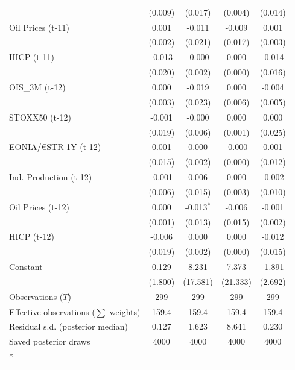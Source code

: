 \begin{longtable}[t]{lcccc}
 & (0.009) & (0.017) & (0.004) & (0.014)\\
Oil Prices (t-11) & 0.001 & -0.011 & -0.009 & 0.001\\
 & (0.002) & (0.021) & (0.017) & (0.003)\\
HICP (t-11) & -0.013 & -0.000 & 0.000 & -0.014\\
 & (0.020) & (0.002) & (0.000) & (0.016)\\
OIS\_3M (t-12) & 0.000 & -0.019 & 0.000 & -0.004\\
 & (0.003) & (0.023) & (0.006) & (0.005)\\
STOXX50 (t-12) & -0.001 & -0.000 & 0.000 & 0.000\\
 & (0.019) & (0.006) & (0.001) & (0.025)\\
EONIA/€STR 1Y (t-12) & 0.001 & 0.000 & -0.000 & 0.001\\
 & (0.015) & (0.002) & (0.000) & (0.012)\\
Ind. Production (t-12) & -0.001 & 0.006 & 0.000 & -0.002\\
 & (0.006) & (0.015) & (0.003) & (0.010)\\
Oil Prices (t-12) & 0.000 & -0.013$^{*}$ & -0.006 & -0.001\\
 & (0.001) & (0.013) & (0.015) & (0.002)\\
HICP (t-12) & -0.006 & 0.000 & 0.000 & -0.012\\
 & (0.019) & (0.002) & (0.000) & (0.015)\\
Constant & 0.129 & 8.231 & 7.373 & -1.891\\
 & (1.800) & (17.581) & (21.333) & (2.692)\\
\midrule
Observations ($T$) & 299 & 299 & 299 & 299\\
Effective observations ($\sum$ weights) & 159.4 & 159.4 & 159.4 & 159.4\\
Residual s.d. (posterior median) & 0.127 & 1.623 & 8.641 & 0.230\\
Saved posterior draws & 4000 & 4000 & 4000 & 4000\\*
\end{longtable}
\endgroup{}

